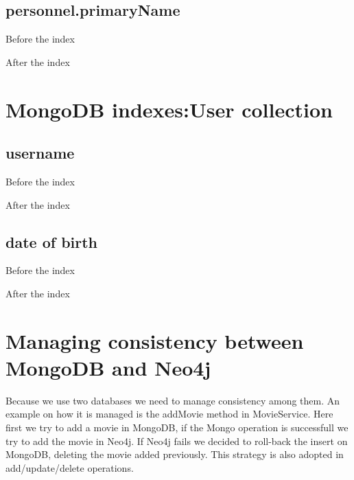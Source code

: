 \begin{alphasection}
\subsection{personnel.primaryName}
Before the index

After the index

\section{MongoDB indexes:User collection}
\subsection{username}
Before the index

After the index

\subsection{date of birth}
Before the index

After the index


\section{Managing consistency between MongoDB and Neo4j}
Because we use two databases we need to manage consistency among them. An example on how it is managed is the addMovie method in MovieService. Here first we try to add a movie in MongoDB, if the Mongo operation is successfull we try to add the movie in Neo4j. If Neo4j fails we decided to roll-back the insert on MongoDB, deleting the movie added previously. This strategy is also adopted in add/update/delete operations.

\end{alphasection}
